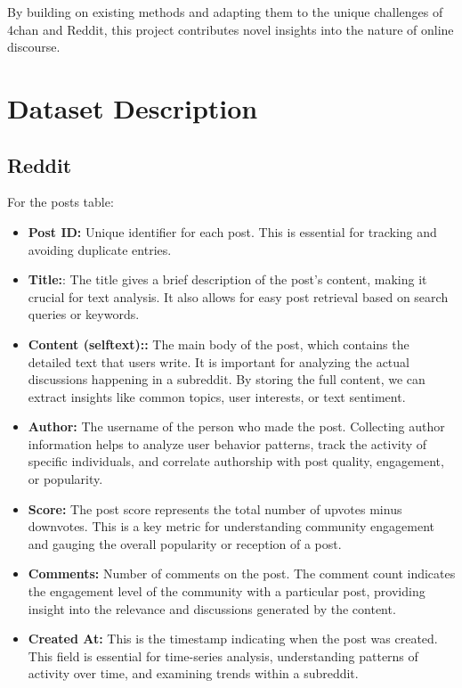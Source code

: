 \documentclass[sigconf]{acmart}
\begin{document}
By building on existing methods and adapting them to the unique challenges of 4chan and Reddit, this project contributes novel insights into the nature of online discourse. 


\section{Dataset Description}
\subsection{Reddit}
For the posts table:

    \begin{itemize}
        \item \textbf{Post ID:} Unique identifier for each post. This is essential for tracking and avoiding duplicate entries.
        
        \item \textbf{Title:}: The title gives a brief description of the post's content, making it crucial for text analysis. It also allows for easy post retrieval based on search queries or keywords.
        
        \item \textbf{Content (selftext)::} The main body of the post, which contains the detailed text that users write. It is important for analyzing the actual discussions happening in a subreddit. By storing the full content, we can extract insights like common topics, user interests, or text sentiment.
        
        \item \textbf{Author:} The username of the person who made the post. Collecting author information helps to analyze user behavior patterns, track the activity of specific individuals, and correlate authorship with post quality, engagement, or popularity.
        
        \item \textbf{Score:} The post score represents the total number of upvotes minus downvotes. This is a key metric for understanding community engagement and gauging the overall popularity or reception of a post.
        
        \item \textbf{Comments:} Number of comments on the post. The comment count indicates the engagement level of the community with a particular post, providing insight into the relevance and discussions generated by the content.
        
        \item \textbf{Created At:} This is the timestamp indicating when the post was created. This field is essential for time-series analysis, understanding patterns of activity over time, and examining trends within a subreddit.
        

\end{itemize}
\end{document}
